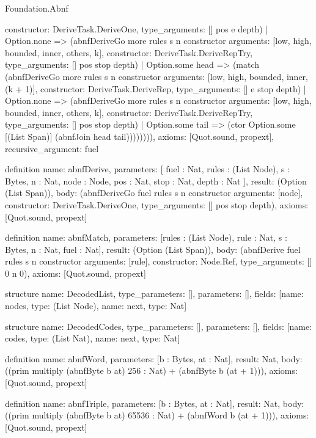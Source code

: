 \begin{lexlean}{Foundation.Abnf}
\begin{semanticmodule}
{{            constructor: DeriveTask.DeriveOne,
            type_arguments: []
          } pos e depth)
          | Option.none => (abnfDeriveGo more rules s n constructor{
            arguments: [low, high, bounded, inner, others, k],
            constructor: DeriveTask.DeriveRepTry,
            type_arguments: []
          } pos stop depth)
          | Option.some head => (match (abnfDeriveGo more rules s n constructor{
              arguments: [low, high, bounded, inner, (k + 1)],
              constructor: DeriveTask.DeriveRep,
              type_arguments: []
            } e stop depth)
            | Option.none => (abnfDeriveGo more rules s n constructor{
              arguments: [low, high, bounded, inner, others, k],
              constructor: DeriveTask.DeriveRepTry,
              type_arguments: []
            } pos stop depth)
            | Option.some tail => (ctor Option.some [(List Span)] (abnfJoin head tail)))))))),
  axioms: [Quot.sound, propext],
  recursive_argument: fuel
}

definition{
  name: abnfDerive,
  parameters: [
    fuel : Nat,
    rules : (List Node),
    s : Bytes,
    n : Nat,
    node : Node,
    pos : Nat,
    stop : Nat,
    depth : Nat
  ],
  result: (Option (List Span)),
  body: (abnfDeriveGo fuel rules s n constructor{
    arguments: [node],
    constructor: DeriveTask.DeriveOne,
    type_arguments: []
  } pos stop depth),
  axioms: [Quot.sound, propext]
}

definition{
  name: abnfMatch,
  parameters: [rules : (List Node), rule : Nat, s : Bytes, n : Nat, fuel : Nat],
  result: (Option (List Span)),
  body: (abnfDerive fuel rules s n constructor{
    arguments: [rule],
    constructor: Node.Ref,
    type_arguments: []
  } 0 n 0),
  axioms: [Quot.sound, propext]
}

structure{
  name: DecodedList,
  type_parameters: [],
  parameters: [],
  fields: [{name: nodes, type: (List Node)}, {name: next, type: Nat}]
}

structure{
  name: DecodedCodes,
  type_parameters: [],
  parameters: [],
  fields: [{name: codes, type: (List Nat)}, {name: next, type: Nat}]
}

definition{
  name: abnfWord,
  parameters: [b : Bytes, at : Nat],
  result: Nat,
  body: ((prim multiply (abnfByte b at) 256 : Nat) + (abnfByte b (at + 1))),
  axioms: [Quot.sound, propext]
}

definition{
  name: abnfTriple,
  parameters: [b : Bytes, at : Nat],
  result: Nat,
  body: ((prim multiply (abnfByte b at) 65536 : Nat) + (abnfWord b (at + 1))),
  axioms: [Quot.sound, propext]
}


\end{semanticmodule}
\end{lexlean}
